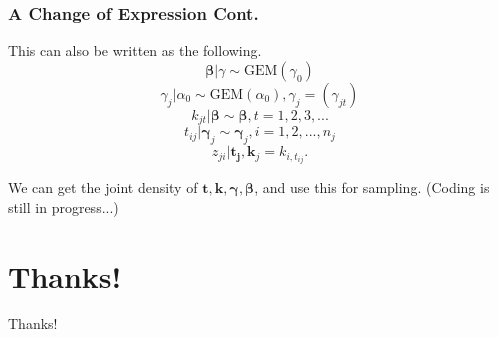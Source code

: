 \documentclass{beamer}
\begin{document}
\begin{frame}
	\frametitle{A Change of Expression Cont.}
	This can also be written as the following.
	$$ \bm{\beta}|\gamma \sim \text{GEM}(\gamma_0)$$ $$ \gamma_j|\alpha_0 \sim \text{GEM}(\alpha_0), \gamma_j=(\gamma_{jt}) $$ $$ k_{jt}|\bm{\beta} \sim \bm{\beta}, t=1, 2, 3, ... $$ $$ t_{ij}|\bm{\gamma}_j\sim \bm{\gamma}_j, i=1, 2, ..., n_j $$ $$ z_{ji}|\bm{t_j}, \bm{k}_j = k_{i, t_{ij}}. $$

	We can get the joint density of $\bm{t}, \bm{k}, \bm{\gamma}, \bm{\beta}$, and use this for sampling. (Coding is still in progress...)
	
\end{frame}

\section*{Thanks!}
\begin{frame}
    \begin{center}
        {\Huge\calligra Thanks!}
    \end{center}
\end{frame}
\end{document}
